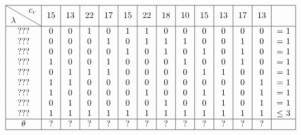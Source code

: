 \documentclass{article}
\begin{document}
    \[
        \begin{tabular}{ |c| c|c|c|c|c|c|c|c|c|c|c|c|c|c | }
            \hline
            \backslashbox{$\lambda$}{$c_r$} &  15 & 13 & 22 & 17 & 15 & 22 & 18 & 10 & 15 & 13 & 17 & 13 & \\
            \hline
            $???$ & 0 & 0 & 1 & 0 & 1 & 1 & 0 & 0 & 0 & 0 & 0 & 0 & = 1\\
            $???$ & 0 & 0 & 0 & 1 & 0 & 1 & 1 & 1 & 0 & 0 & 1 & 0 & = 1\\
            $???$ & 0 & 0 & 0 & 0 & 1 & 0 & 1 & 0 & 1 & 0 & 1 & 0 & = 1\\
            $???$ & 1 & 0 & 0 & 1 & 0 & 0 & 0 & 1 & 0 & 0 & 1 & 0 & = 1\\
            $???$ & 0 & 1 & 1 & 1 & 0 & 0 & 0 & 0 & 1 & 1 & 0 & 0 & = 1\\
            $???$ & 1 & 1 & 0 & 0 & 0 & 0 & 0 & 0 & 0 & 0 & 0 & 1 & = 1\\
            $???$ & 1 & 0 & 0 & 0 & 0 & 1 & 0 & 0 & 1 & 1 & 0 & 1 & = 1\\
            $???$ & 0 & 1 & 0 & 0 & 0 & 0 & 1 & 0 & 0 & 1 & 0 & 1 & = 1\\
            $???$ & 1 & 1 & 1 & 1 & 1 & 1 & 1 & 1 & 1 & 1 & 1 & 1 & $\leq $ 3\\
            \hline
            $\theta$ & ? & ? & ? & ? & ? & ? & ? & ? & ? & ? & ? & ? & \\
            \hline
        \end{tabular}
    \]


    \clearpage
    
    
\end{document}
